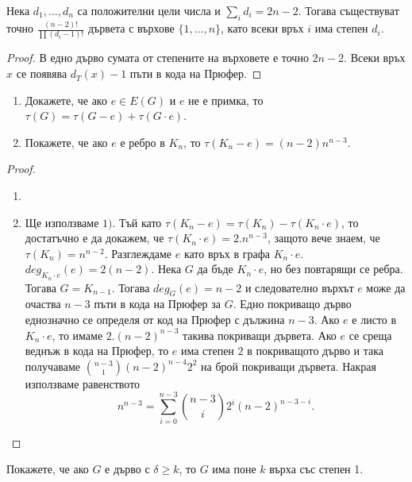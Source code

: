 \begin{corollary}
  Нека $d_1,\dots, d_n$ са положителни цели числа и $\sum_i d_i = 2n - 2$.
  Тогава съществуват точно $\frac{(n-2)!}{\prod(d_i - 1)!}$ дървета с върхове $\{1,\dots,n\}$, 
  като всеки връх $i$ има степен $d_i$.
\end{corollary}
\begin{proof}
  В едно дърво сумата от степените на върховете е точно $2n - 2$.
  Всеки връх $x$ се появява $d_T(x) - 1$ пъти в кода на Прюфер.
\end{proof}



\begin{problem}
  \begin{enumerate}[1)]
  \item
    Докажете, че ако $e\in E(G)$ и $e$ не е примка, то
    $\tau(G) = \tau(G - e) + \tau(G\cdot e)$.
  \item
    Покажете, че ако $e$ е ребро в $K_n$, то $\tau(K_n - e) = (n-2)n^{n-3}$.
  \end{enumerate}
\end{problem}
\begin{proof}
  \begin{enumerate}[1)]
  \item
    
  \item
    Ще използваме $1)$.
    Тъй като $\tau(K_n - e) = \tau(K_n) - \tau(K_n\cdot e)$, то достатъчно е да докажем, че
    $\tau(K_n\cdot e) = 2.n^{n-3}$, защото вече знаем, че $\tau(K_n) = n^{n-2}$.
    Разглеждаме $e$ като връх в графа $K_n\cdot e$.
    $deg_{K_n\cdot e}(e) = 2(n-2)$.
    Нека $G$ да бъде $K_n\cdot e$, но без повтарящи се ребра.
    Тогава $G = K_{n-1}$.
    Тогава $deg_G(e) = n-2$ и следователно върхът $e$ може да очаства
    $n-3$ пъти в кода на Прюфер за $G$.
    Едно покриващо дърво еднозначно се определя от код на Прюфер с дължина $n-3$.
    Ако $e$ е листо в $K_n\cdot e$, то имаме $2.(n-2)^{n-3}$ такива покриващи дървета.
    Ако $e$ се среща веднъж в кода на Прюфер, то $e$ има степен $2$ в покриващото дърво
    и така получаваме
    $\binom{n-3}{1}(n-2)^{n-4}2^2$ на брой покриващи дървета.
    Накрая използваме равенството
    \[n^{n-3} = \sum^{n-3}_{i=0}\binom{n-3}{i}2^i(n-2)^{n-3-i}.\]
\end{enumerate}

\end{proof}


\begin{problem}
  Покажете, че ако $G$ е дърво с $\delta \geq k$, то $G$ има поне $k$ върха със степен 1.
\end{problem}

